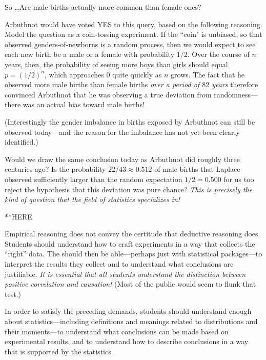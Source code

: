 \smallskip

\noindent
So \ldots Are male births actually more common than female ones?

\smallskip

\noindent
Arbuthnot would have voted YES to this query, based on the following reasoning.  Model the question as a coin-tossing experiment.  If the ``coin" is unbiased, so that observed genders-of-newborns is a random process, then we would expect to see each new birth be a male or a female with probability $1/2$.  Over the course of $n$ years, then, the probability of seeing more boys than girls should equal 
$p=(1/2)^{n}$, which approaches $0$ quite quickly as $n$ grows.  The fact that he observed more male births than female births {\em over a period of $82$ years} therefore convinced Arbuthnot that he was observing a true deviation from randomness---there was an actual bias toward male births!

\smallskip

\noindent
(Interestingly the gender imbalance in births exposed by Arbuthnot can still be observed today---and the reason for the imbalance has not yet been clearly identified.)

\smallskip

Would we draw the same conclusion today as Arbuthnot did roughly three centuries ago?  Is the probability $22/43 \approx 0.512$ of male births that Laplace observed sufficiently larger than the random expectation $1/2 = 0.500$ for us too reject the hypothesis that this deviation was pure chance?  {\em This is precisely the kind of question that the field of statistics specializes in!}

\smallskip




**HERE


\bigskip
 
Empirical reasoning does not convey the certitude that deductive
reasoning does.  Students should understand how to craft experiments
in a way that collects the ``right'' data.  The should then be
able---perhaps just with statistical packages---to interpret the
results they collect and to understand what conclusions are
justifiable.  {\em It is essential that all students understand the                  
  distinction between {\em positive correlation} and {\em causation}!}
(Most of the public would seem to flunk that test.)

In order to satisfy the preceding demands, students should understand
enough about statistics---including definitions and meanings related
to distributions and their moments---to understand what conclusions
can be made based on experimental results, and to understand how to
describe conclusions in a way that is supported by the statistics.




